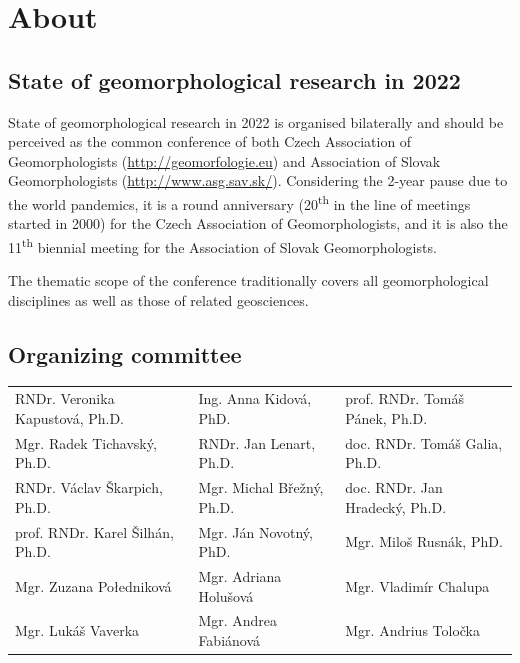 \documentclass[
	openany, %
	parskip=false, %
	12pt, %
	a4paper, %
]{conferencebooklet} %
\begin{document}
\newpage


\tableofcontents


\chapter{About}
\section{State of geomorphological research in 2022}
\noindent
State of geomorphological research in 2022 is organised bilaterally and should be perceived as the common conference of both Czech Association of Geomorphologists (\url{http://geomorfologie.eu}) and Association of Slovak Geomorphologists (\url{http://www.asg.sav.sk/}). Considering the 2-year pause due to the world pandemics, it is a round anniversary (20\textsuperscript{th} in the line of meetings started in 2000) for the Czech Association of Geomorphologists, and it is also the 11\textsuperscript{th} biennial meeting for the Association of Slovak Geomorphologists.

The thematic scope of the conference traditionally covers all geomorphological disciplines as well as those of related geosciences. 

\vspace{5em}
\section{Organizing committee}

\begin{flushleft}
	\begin{tabular}{l l l}
	RNDr. Veronika Kapustová, Ph.D. & Ing. Anna Kidová, PhD. & prof. RNDr. Tomáš Pánek, Ph.D.\\
	Mgr. Radek Tichavský, Ph.D. & RNDr. Jan Lenart, Ph.D. & doc. RNDr. Tomáš Galia, Ph.D.\\
	RNDr. Václav Škarpich, Ph.D. & Mgr. Michal Břežný, Ph.D. & doc. RNDr. Jan Hradecký, Ph.D.\\
	prof. RNDr. Karel Šilhán, Ph.D. & Mgr. Ján Novotný, PhD. & Mgr. Miloš Rusnák, PhD.\\
	Mgr. Zuzana Połedniková & Mgr. Adriana Holušová & Mgr. Vladimír Chalupa\\
	Mgr. Lukáš Vaverka & Mgr. Andrea Fabiánová & Mgr. Andrius Toločka 
	
	\end{tabular}
\end{flushleft}
\end{document}
